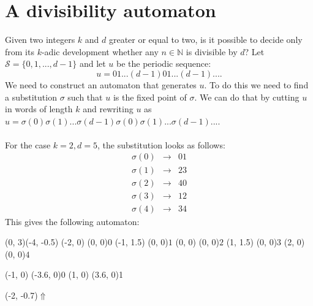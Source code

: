 \documentclass{article}
\begin{document}
\section*{A divisibility automaton}
Given two integers $k$ and $d$ greater or equal to two, is it possible to
decide only from its $k$-adic development whether any $n \in \mathbb{N}$ is
divisible by $d$? Let $\mathcal{S} = \{0, 1, ..., d - 1\}$ and let $u$ be the
periodic sequence:
\begin{displaymath}
  u = 01...(d - 1)01...(d - 1)... .
\end{displaymath}
We need to construct an automaton that generates $u$. To do this we need to
find a substitution $\sigma$ such that $u$ is the fixed point of $\sigma$.
We can do that by cutting $u$ in words of length $k$ and rewriting $u$ as
$u = \sigma(0)\sigma(1)...\sigma(d - 1)\sigma(0)\sigma(1)...\sigma(d - 1)...$.\\
\\
For the case $k = 2, d = 5$, the substitution looks as follows:
\begin{eqnarray*}
  \sigma(0) &\rightarrow& 01\\
  \sigma(1) &\rightarrow& 23\\
  \sigma(2) &\rightarrow& 40\\
  \sigma(3) &\rightarrow& 12\\
  \sigma(4) &\rightarrow& 34
\end{eqnarray*}
This gives the following automaton:\\
\begin{graph}(0, 3)(-4, -0.5)
  (-2, 0) (0, 0){$0$}
  (-1, 1.5) (0, 0){$1$}
  (0, 0) (0, 0){$2$}
  (1, 1.5) (0, 0){$3$}
  (2, 0) (0, 0){$4$}

  (-1, 0) \freetext(-3.6, 0){0}
   
   
   
   
   
   
   
   
  (1, 0) \freetext(3.6, 0){1}

  \freetext(-2, -0.7){$\Uparrow$}
\end{graph}\\
\end{document}
